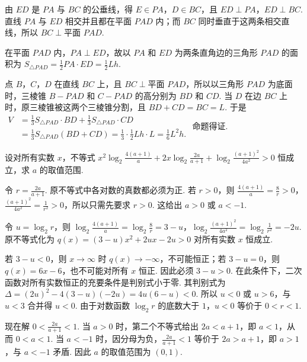 \documentclass[UTF8,a4paper,oneside,11pt]{ctexbook}
\begin{document}
\begin{solution}
由 \(ED\) 是 \(PA\) 与 \(BC\) 的公垂线，得 \(E\in PA\)，\(D\in BC\)，且 \(ED\perp PA\)，\(ED\perp BC\). 直线 \(PA\) 与 \(ED\) 相交并且都在平面 \(PAD\) 内；而 \(BC\) 同时垂直于这两条相交直线，所以 \(BC\perp\text{平面 }PAD\).

在平面 \(PAD\) 内，\(PA\perp ED\)，故以 \(PA\) 和 \(ED\) 为两条直角边的三角形 \(PAD\) 的面积为 \(S_{\triangle PAD}=\frac12PA\cdot ED=\frac12Lh\).

点 \(B\)，\(C\)，\(D\) 在直线 \(BC\) 上，且 \(BC\perp\text{平面 }PAD\)，所以以三角形 \(PAD\) 为底面时，三棱锥 \(B-PAD\) 和 \(C-PAD\) 的高分别为 \(BD\) 和 \(CD\). 当 \(D\) 在边 \(BC\) 上时，原三棱锥被这两个三棱锥分割，且 \(BD+CD=BC=L\). 于是
\(\begin{aligned}
V&=\frac13S_{\triangle PAD}\cdot BD+\frac13S_{\triangle PAD}\cdot CD\\
&=\frac13S_{\triangle PAD}(BD+CD)=\frac13\cdot\frac12Lh\cdot L=\frac16L^2h.
\end{aligned}\)
命题得证.
\end{solution}

\begin{problem}
设对所有实数 \(x\)，不等式 \(x^2\log_2 \frac{4(a + 1)}{a} + 2x\log_2 \frac{2a}{a + 1} + \log_2 \frac{(a + 1)^2}{4a^2} > 0\) 恒成立，求 \(a\) 的取值范围.
\end{problem}

\begin{solution}
令 \(r=\frac{2a}{a+1}\). 原不等式中各对数的真数都必须为正. 若 \(r>0\)，则 \(\frac{4(a+1)}a=\frac8r>0\)，\(\frac{(a+1)^2}{4a^2}=\frac1{r^2}>0\)，所以只需先要求 \(r>0\). 这给出 \(a>0\) 或 \(a<-1\).

令 \(u=\log_2r\)，则 \(\log_2\frac{4(a+1)}a=\log_2\frac8r=3-u\)，\(\log_2\frac{(a+1)^2}{4a^2}=\log_2\frac1{r^2}=-2u\). 原不等式化为 \(q(x)=(3-u)x^2+2ux-2u>0\) 对所有实数 \(x\) 恒成立.

若 \(3-u<0\)，则 \(x\to\infty\) 时 \(q(x)\to-\infty\)，不可能恒正；若 \(3-u=0\)，则 \(q(x)=6x-6\)，也不可能对所有 \(x\) 恒正. 因此必须 \(3-u>0\). 在此条件下，二次函数对所有实数恒正的充要条件是判别式小于零. 其判别式为 \(\Delta=(2u)^2-4(3-u)(-2u)=4u(6-u)<0\). 所以 \(u<0\) 或 \(u>6\)，与 \(u<3\) 合并得 \(u<0\). 由于对数函数 \(\log_2 r\) 的底数大于 \(1\)，\(u<0\) 等价于 \(0<r<1\).

现在解 \(0<\frac{2a}{a+1}<1\). 当 \(a>0\) 时，第二个不等式给出 \(2a<a+1\)，即 \(a<1\)，从而 \(0<a<1\). 当 \(a<-1\) 时，因分母为负，\(\frac{2a}{a+1}<1\) 等价于 \(2a>a+1\)，即 \(a>1\)，与 \(a<-1\) 矛盾. 因此 \(a\) 的取值范围为 \((0,1)\).
\end{solution}
\end{document}
